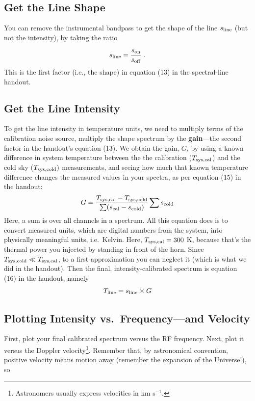 \documentclass[11pt,preprint]{aastex}
\begin{document}
\subsection{Get the Line Shape}

You can remove the instrumental bandpass to get the shape
of the line $s_{\rm line}$ (but not the intensity), by taking the ratio 

\begin{equation}
s_{\rm line} = \frac{s_{\rm on}}{s_{\rm off}} \ .
\end{equation}
%
This is the first factor (i.e., the shape) in equation
(13) in the spectral-line handout.
%
\subsection{Get the Line Intensity}

\noindent
To get the line intensity in temperature units, we need to multiply terms of the calibration noise source,
multiply the shape spectrum by the {\bf gain}---the second factor in
the handout's equation (13). We obtain the gain, $G$, by using a known
difference in system temperature between the 
the calibration ($T_{\rm sys,cal}$) and the cold sky ($T_{\rm sys,cold})$
measurements, and seeing how much that known temperature difference changes
the measured values in your spectra,  as per equation (15)
in the handout:
%
\begin{equation}
G =
\frac{T_{\rm sys,cal} - T_{\rm sys,cold}}{\sum(s_{\rm cal} - s_{\rm cold})} 
\sum s_{\rm cold} 
\end{equation}
\noindent Here, a sum is over all channels in a spectrum. All this
equation does is to convert measured units, which are digital numbers
from the system, into physically meaningful units, i.e.\ Kelvin. Here,
$T_{\rm sys,cal} = 300$ K, because that's the thermal power you injected by
standing in front of the horn. Since $T_{\rm sys,cold} \ll
T_{\rm sys,cal}$, to a first approximation you can neglect it (which is what we
did in the handout). Then the final, intensity-calibrated spectrum is
equation (16) in the handout, namely
\begin{equation}
T_{\rm line} = s_{\rm line} \times G
\end{equation}
%
\subsection{Plotting Intensity vs.\ Frequency---and Velocity}

\noindent
First,
plot your final calibrated spectrum versus the RF frequency. Next,
plot it versus the Doppler velocity\footnote{Astronomers usually express
  velocities in km s$^{-1}$.}.  Remember that, by astronomical
convention, positive velocity means motion away (remember the expansion
of the Universe!), so
\end{document}
